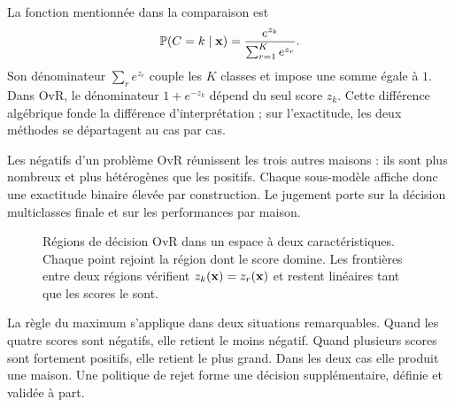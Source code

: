 La fonction  mentionnée dans la comparaison est
\[
  \mathbb{P}(C=k\mid\mathbf{x})
  =\frac{e^{z_k}}{\sum_{r=1}^K e^{z_r}}.
\]
Son dénominateur $\sum_r e^{z_r}$ couple les $K$ classes et impose une somme
égale à $1$. Dans OvR, le dénominateur $1+e^{-z_k}$ dépend du seul score $z_k$.
Cette différence algébrique fonde la différence d'interprétation ; sur
l'exactitude, les deux méthodes se départagent au cas par cas.

Les négatifs d'un problème OvR réunissent les trois autres maisons : ils sont
plus nombreux et plus hétérogènes que les positifs. Chaque sous-modèle affiche
donc une exactitude binaire élevée par construction. Le jugement porte sur la
décision multiclasses finale et sur les performances par maison.

\begin{figure}[htbp]
\centering
{}
\caption{Régions de décision OvR dans un espace à deux caractéristiques. Chaque
point rejoint la région dont le score domine. Les frontières entre deux régions
vérifient $z_k(\mathbf{x})=z_r(\mathbf{x})$ et restent linéaires tant que les scores le sont.}
\label{fig:ovr-regions}
\end{figure}

La règle du maximum s'applique dans deux situations remarquables. Quand les
quatre scores sont négatifs, elle retient le moins négatif. Quand plusieurs
scores sont fortement positifs, elle retient le plus grand. Dans les deux cas
elle produit une maison. Une politique de rejet forme une décision
supplémentaire, définie et validée à part.

